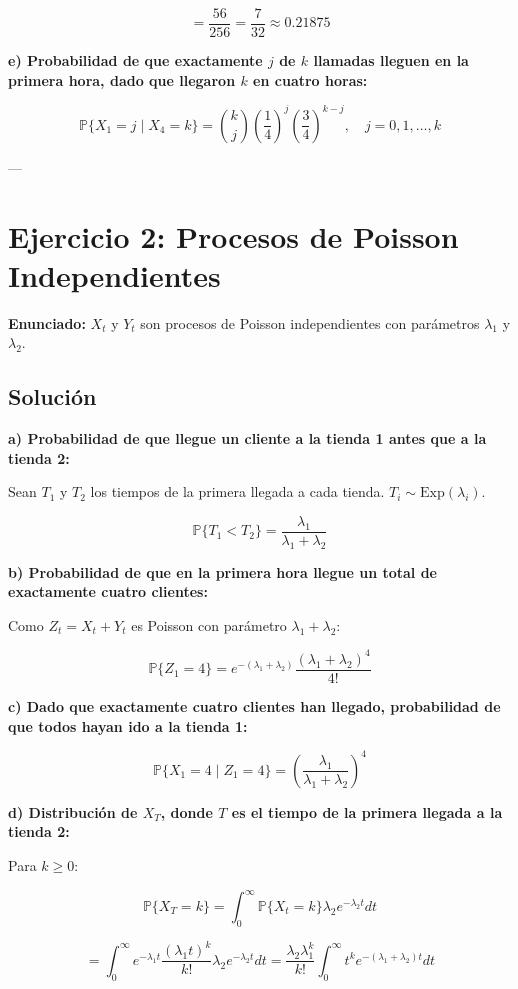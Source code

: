 \documentclass{article}
\theoremstyle{definition}
\newcommand{\Prob}{\mathbb{P}}
\begin{document}
\[
= \frac{56}{256} = \frac{7}{32} \approx 0.21875
\]

\textbf{e) Probabilidad de que exactamente $j$ de $k$ llamadas lleguen en la primera hora, dado que llegaron $k$ en cuatro horas:}

\[
\Prob\{X_1 = j \mid X_4 = k\} = \binom{k}{j} \left(\frac{1}{4}\right)^j \left(\frac{3}{4}\right)^{k-j}, \quad j = 0,1,\dots,k
\]

---

\section*{Ejercicio 2: Procesos de Poisson Independientes}

\textbf{Enunciado:} $X_t$ y $Y_t$ son procesos de Poisson independientes con parámetros $\lambda_1$ y $\lambda_2$.

\subsection*{Solución}

\textbf{a) Probabilidad de que llegue un cliente a la tienda 1 antes que a la tienda 2:}

Sean $T_1$ y $T_2$ los tiempos de la primera llegada a cada tienda. $T_i \sim \text{Exp}(\lambda_i)$.

\[
\Prob\{T_1 < T_2\} = \frac{\lambda_1}{\lambda_1 + \lambda_2}
\]

\textbf{b) Probabilidad de que en la primera hora llegue un total de exactamente cuatro clientes:}

Como $Z_t = X_t + Y_t$ es Poisson con parámetro $\lambda_1 + \lambda_2$:

\[
\Prob\{Z_1 = 4\} = e^{-(\lambda_1+\lambda_2)} \frac{(\lambda_1+\lambda_2)^4}{4!}
\]

\textbf{c) Dado que exactamente cuatro clientes han llegado, probabilidad de que todos hayan ido a la tienda 1:}

\[
\Prob\{X_1 = 4 \mid Z_1 = 4\} = \left(\frac{\lambda_1}{\lambda_1+\lambda_2}\right)^4
\]

\textbf{d) Distribución de $X_T$, donde $T$ es el tiempo de la primera llegada a la tienda 2:}

Para $k \geq 0$:

\[
\Prob\{X_T = k\} = \int_0^\infty \Prob\{X_t = k\} \lambda_2 e^{-\lambda_2 t} dt
\]

\[
= \int_0^\infty e^{-\lambda_1 t} \frac{(\lambda_1 t)^k}{k!} \lambda_2 e^{-\lambda_2 t} dt = \frac{\lambda_2 \lambda_1^k}{k!} \int_0^\infty t^k e^{-(\lambda_1+\lambda_2)t} dt
\]
\end{document}
